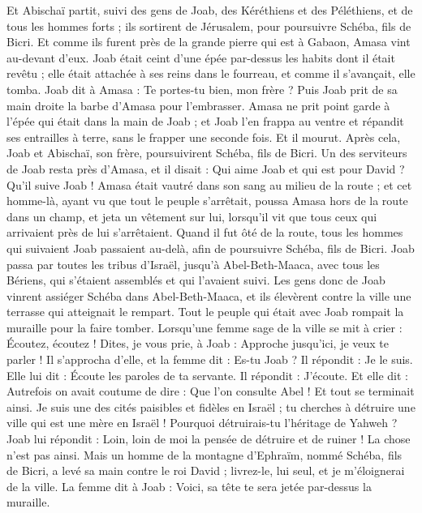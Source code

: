 \begin{multicols}{2}
Et Abischaï partit, suivi des gens de Joab, des Kéréthiens et des Péléthiens, et de tous les hommes forts ; ils sortirent de Jérusalem, pour poursuivre Schéba, fils de Bicri.
Et comme ils furent près de la grande pierre qui est à Gabaon, Amasa vint au-devant d'eux. Joab était ceint d'une épée par-dessus les habits dont il était revêtu ; elle était attachée à ses reins dans le fourreau, et comme il s’avançait, elle tomba.
Joab dit à Amasa : Te portes-tu bien, mon frère ? Puis Joab prit de sa main droite la barbe d’Amasa pour l'embrasser.
Amasa ne prit point garde à l'épée qui était dans la main de Joab ; et Joab l'en frappa au ventre et répandit ses entrailles à terre, sans le frapper une seconde fois. Et il mourut. Après cela, Joab et Abischaï, son frère, poursuivirent Schéba, fils de Bicri.
Un des serviteurs de Joab resta près d'Amasa, et il disait : Qui aime Joab et qui est pour David ? Qu'il suive Joab !
Amasa était vautré dans son sang au milieu de la route ; et cet homme-là, ayant vu que tout le peuple s'arrêtait, poussa Amasa hors de la route dans un champ, et jeta un vêtement sur lui, lorsqu’il vit que tous ceux qui arrivaient près de lui s'arrêtaient.
Quand il fut ôté de la route, tous les hommes qui suivaient Joab passaient au-delà, afin de poursuivre Schéba, fils de Bicri.
Joab passa par toutes les tribus d'Israël, jusqu'à Abel-Beth-Maaca, avec tous les Bériens, qui s’étaient assemblés et qui l’avaient suivi.
Les gens donc de Joab vinrent assiéger Schéba dans Abel-Beth-Maaca, et ils élevèrent contre la ville une terrasse qui atteignait le rempart. Tout le peuple qui était avec Joab rompait la muraille pour la faire tomber.
Lorsqu’une femme sage de la ville se mit à crier : Écoutez, écoutez ! Dites, je vous prie, à Joab : Approche jusqu'ici, je veux te parler !
Il s’approcha d’elle, et la femme dit : Es-tu Joab ? Il répondit : Je le suis. Elle lui dit : Écoute les paroles de ta servante. Il répondit : J'écoute.
Et elle dit : Autrefois on avait coutume de dire : Que l'on consulte Abel ! Et tout se terminait ainsi.
Je suis une des cités paisibles et fidèles en Israël ; tu cherches à détruire une ville qui est une mère en Israël ! Pourquoi détruirais-tu l'héritage de Yahweh ?
Joab lui répondit : Loin, loin de moi la pensée de détruire et de ruiner !
La chose n'est pas ainsi. Mais un homme de la montagne d'Ephraïm, nommé Schéba, fils de Bicri, a levé sa main contre le roi David ; livrez-le, lui seul, et je m’éloignerai de la ville. La femme dit à Joab : Voici, sa tête te sera jetée par-dessus la muraille.

\end{multicols}
